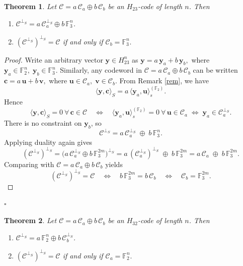 \documentclass[11pt,a4paper]{article}
\def\qed{\hfill {$\square$}\goodbreak \medskip}
\newtheorem{theorem}{Theorem}[section]
\theoremstyle{definition}
\numberwithin{equation}{section}
\def\C{{\mathcal{C}}}
\begin{document}
\begin{theorem}\label{thmdualH23} 
Let $\C=a\, \C_a \oplus b\, \C_b$ be an $H_{23}$-code of length $n$. Then

\begin{enumerate}
\item  $\C^{\perp_S} = a \, \C_a^{\perp_S}  \oplus b \, \mathbb{F}_3^{n}$.
\item $(\C^{\perp_S})^{\perp_S}=\C$ if and only if $\C_b=\mathbb{F}_3^{n}.$

\end{enumerate}

\end{theorem}
\begin{proof}
Write an arbitrary vector \(\mathbf{y}\in H_{23}^{n}\) as $\mathbf{y} = a\,\mathbf{y}_a + b\,\mathbf{y}_b,
$ where $
\mathbf{y}_a\in\mathbb{F}_2^{n},\;\mathbf{y}_b\in\mathbb{F}_3^{n}.$
Similarly, any codeword in \(\mathcal{C}=a\,\mathcal{C}_a\oplus b\,\mathcal{C}_b\) can be written $\mathbf{c} = a\,\mathbf{u} + b\,\mathbf{v},$ where $\mathbf{u}\in\mathcal{C}_a,\;\mathbf{v}\in\mathcal{C}_b.$
From Remark \ref{rem}, we have 
\[
\langle \mathbf{y},\mathbf{c}\rangle_S
= a\,\langle \mathbf{y}_a,\mathbf{u}\rangle_s^{(\mathbb{F}_2)}.
\]
Hence
\[
\langle \mathbf{y},\mathbf{c}\rangle_S = 0\ \forall\,\mathbf{c}\in\C
\quad\Longleftrightarrow\quad
\langle \mathbf{y}_a,\mathbf{u}\rangle_s^{(\mathbb{F}_2)}=0\ \forall\,\mathbf{u}\in\C_a
\;\Longleftrightarrow\;
\mathbf{y}_a\in\C_a^{\perp_S}.
\]
There is no constraint on \(\mathbf{y}_b\), so
\[
\C^{\perp_S}
= a\,\C_a^{\perp_S}\;\oplus\;b\,\mathbb{F}_3^{n}.
\]
Applying duality again gives
\[
(\mathcal{C}^{\perp_S})^{\perp_S}
= \bigl(a\,\mathcal{C}_a^{\perp_S}\oplus b\,\mathbb{F}_3^{2m}\bigr)^{\perp_S}
= a\,(\mathcal{C}_a^{\perp_S})^{\perp_S}\;\oplus\;b\,\mathbb{F}_3^{2m}
= a\,\mathcal{C}_a\;\oplus\;b\,\mathbb{F}_3^{2m}.
\]
Comparing with \(\mathcal{C}=a\,\mathcal{C}_a\oplus b\,\mathcal{C}_b\) yields
\[
(\mathcal{C}^{\perp_S})^{\perp_S} = \mathcal{C}
\quad\Longleftrightarrow\quad
b\,\mathbb{F}_3^{2m} = b\,\mathcal{C}_b
\quad\Longleftrightarrow\quad
\mathcal{C}_b = \mathbb{F}_3^{2m}.
\]

\end{proof}
\qed
\begin{theorem}\label{thmdualH32} 
Let $\C=a\, \C_a \oplus b\, \C_b$ be an $H_{32}$-code of length $n$. Then

\begin{enumerate}
\item  $\C^{\perp_S} = a \,  \mathbb{F}_2^{n}   \oplus b \, \C_b^{\perp_S}$.
\item $(\C^{\perp_S})^{\perp_S}=\C$ if and only if $\C_a=\mathbb{F}_2^{n}.$

\end{enumerate}

\end{theorem}
\end{document}
